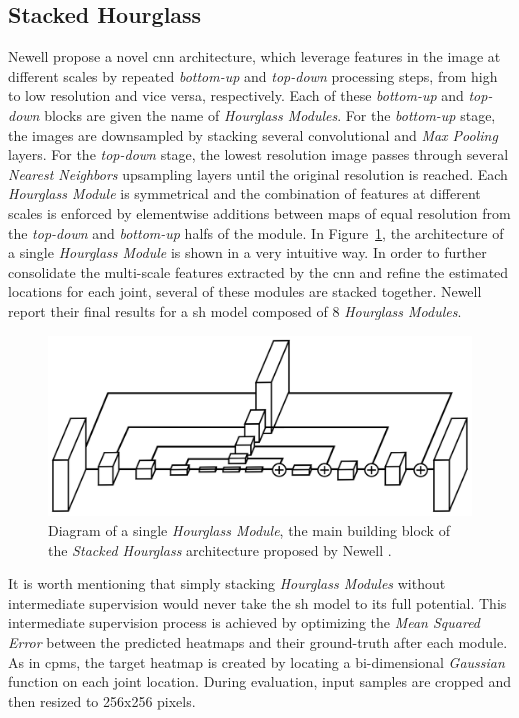 \subsection{Stacked Hourglass}\label{subsec:sh}
Newell \etal\cite{Newell2016-cy} propose a novel \gls{cnn} architecture, which leverage features in the image at different scales by repeated \emph{bottom-up} and \emph{top-down} processing steps, \ie from high to low resolution and vice versa, respectively. Each of these \emph{bottom-up} and \emph{top-down} blocks are given the name of \emph{Hourglass Modules}. For the \emph{bottom-up} stage, the images are downsampled by stacking several convolutional and \emph{Max Pooling} layers. For the \emph{top-down} stage, the lowest resolution image passes through several \emph{Nearest Neighbors} upsampling layers until the original resolution is reached. Each \emph{Hourglass Module} is symmetrical and the combination of features at different scales is enforced by elementwise additions between maps of equal resolution from the \emph{top-down} and \emph{bottom-up} halfs of the module. In Figure~\ref{fig:sh}, the architecture of a single \emph{Hourglass Module} is shown in a very intuitive way. In order to further consolidate the multi-scale features extracted by the \gls{cnn} and refine the estimated locations for each joint, several of these modules are stacked together. Newell \etal report their final results for a \gls{sh} model composed of 8 \emph{Hourglass Modules}.

\begin{figure}[h]
    \centering
    \includegraphics[width=\textwidth]{figures/sh.png}
    \caption{Diagram of a single \emph{Hourglass Module}, the main building block of the \emph{Stacked Hourglass} architecture proposed by Newell \etal\cite{Newell2016-cy}.}
    \label{fig:sh}
\end{figure}

It is worth mentioning that simply stacking \emph{Hourglass Modules} without intermediate supervision would never take the \gls{sh} model to its full potential. This intermediate supervision process is achieved by optimizing the \emph{Mean Squared Error} between the predicted heatmaps and their ground-truth after each module. As in \glspl{cpm}, the target heatmap is created by locating a bi-dimensional \emph{Gaussian} function on each joint location. During evaluation, input samples are cropped and then resized to 256x256 pixels.

